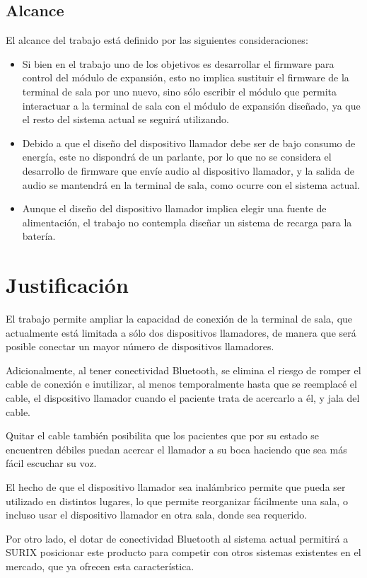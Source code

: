 \subsection{Alcance}

El alcance del trabajo está definido por las siguientes consideraciones:

\begin{itemize}
\item Si bien en el trabajo uno de los objetivos es desarrollar el firmware para control del módulo de expansión, esto no implica sustituir el firmware de la terminal de sala por uno nuevo, sino sólo escribir el módulo que permita interactuar a la terminal de sala con el módulo de expansión diseñado, ya que el resto del sistema actual se seguirá utilizando.	

\item Debido a que el diseño del dispositivo llamador debe ser de bajo consumo de energía, este no dispondrá de un parlante, por lo que no se considera el desarrollo de firmware que envíe audio al dispositivo llamador, y la salida de audio se mantendrá en la terminal de sala, como ocurre con el sistema actual.

\item Aunque el diseño del dispositivo llamador implica elegir una fuente de alimentación, el trabajo no contempla diseñar un sistema de recarga para la batería.

\end{itemize}


\section{Justificación}

El trabajo permite ampliar la capacidad de conexión de la terminal de sala, que actualmente está limitada a sólo dos dispositivos llamadores, de manera que será posible conectar un mayor número de dispositivos llamadores.

Adicionalmente, al tener conectividad Bluetooth, se elimina el riesgo de romper el cable de conexión e inutilizar, al menos temporalmente hasta que se reemplacé el cable, el dispositivo llamador cuando el paciente trata de acercarlo a él, y jala del cable.

Quitar el cable también posibilita que los pacientes que por su estado se encuentren débiles puedan acercar el llamador a su boca haciendo que sea más fácil escuchar su voz.

El hecho de que el dispositivo llamador sea inalámbrico permite que pueda ser utilizado en distintos lugares, lo que permite reorganizar fácilmente una sala, o incluso usar el dispositivo llamador en otra sala, donde sea requerido.

Por otro lado, el dotar de conectividad Bluetooth al sistema actual permitirá a SURIX posicionar este producto para competir con otros sistemas existentes en el mercado, que ya ofrecen esta característica.
